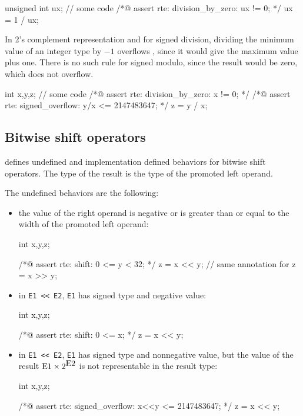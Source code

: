 \begin{listing-nonumber}
unsigned int ux;
// some code
/*@ assert rte: division_by_zero: ux != 0; */
ux = 1 / ux;
\end{listing-nonumber}

In 2's complement representation and for signed division, dividing the minimum
value of an integer type by $-1$ overflows , since it would give the maximum
value plus one.  There is no such rule for signed modulo, since the result would
be zero, which does not overflow.

\begin{listing-nonumber}
int x,y,z;
// some code
/*@ assert rte: division_by_zero: x != 0; */
/*@ assert rte: signed_overflow: y/x <= 2147483647; */
z = y / x;
\end{listing-nonumber}


\subsection{Bitwise shift operators}

 defines undefined and implementation defined
behaviors for bitwise shift operators.  The type of the result is the type of
the promoted left operand.

The undefined behaviors are the following:
\begin{itemize}
\item the value of the right operand is negative or is greater than or equal to
  the width of the promoted left operand:

\begin{listing-nonumber}
int x,y,z;

/*@ assert rte: shift: 0 <= y < 32; */
z = x << y; // same annotation for z = x >> y;
\end{listing-nonumber}

\item in \lstinline|E1 << E2|, \lstinline|E1| has signed type and negative
  value:

\begin{listing-nonumber}
int x,y,z;

/*@ assert rte: shift: 0 <= x; */
z = x << y;
\end{listing-nonumber}

\item in \lstinline|E1 << E2|, \lstinline|E1| has signed type and nonnegative
  value, but the value of the result $\lstinline|E1| \times 2^{\lstinline|E2|}$
  is not representable in the result type:

\begin{listing-nonumber}
int x,y,z;

/*@ assert rte: signed_overflow: x<<y <= 2147483647; */
z = x << y;
\end{listing-nonumber}

\end{itemize}

